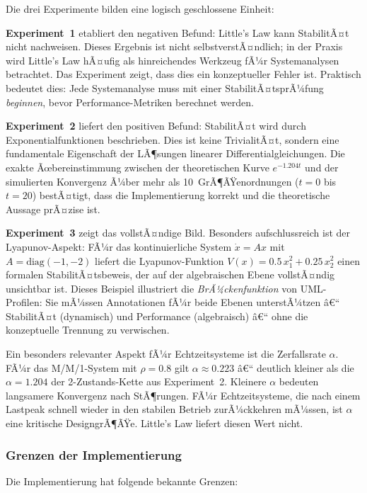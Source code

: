 ﻿\documentclass[a4paper,12pt]{scrreprt}
\theoremstyle{definition}
\begin{document}
Die drei Experimente bilden eine logisch geschlossene Einheit:

\textbf{Experiment~1} etabliert den negativen Befund: Little's Law
kann StabilitÃ¤t nicht nachweisen.  Dieses Ergebnis ist nicht
selbstverstÃ¤ndlich; in der Praxis wird Little's Law hÃ¤ufig als
hinreichendes Werkzeug fÃ¼r Systemanalysen betrachtet.  Das Experiment
zeigt, dass dies ein konzeptueller Fehler ist.  Praktisch bedeutet
dies: Jede Systemanalyse muss mit einer StabilitÃ¤tsprÃ¼fung
\emph{beginnen}, bevor Performance-Metriken berechnet werden.

\textbf{Experiment~2} liefert den positiven Befund: StabilitÃ¤t wird
durch Exponentialfunktionen beschrieben.  Dies ist keine TrivialitÃ¤t,
sondern eine fundamentale Eigenschaft der LÃ¶sungen linearer
Differentialgleichungen.  Die exakte Ãœbereinstimmung zwischen der
theoretischen Kurve $e^{-1.204t}$ und der simulierten Konvergenz
Ã¼ber mehr als 10~GrÃ¶ÃŸenordnungen ($t = 0$ bis $t = 20$) bestÃ¤tigt,
dass die Implementierung korrekt und die theoretische Aussage prÃ¤zise
ist.

\textbf{Experiment~3} zeigt das vollstÃ¤ndige Bild.  Besonders
aufschlussreich ist der Lyapunov-Aspekt: FÃ¼r das kontinuierliche
System $\dot{x} = Ax$ mit $A = \text{diag}(-1,-2)$ liefert die
Lyapunov-Funktion $V(x) = 0.5\,x_1^2 + 0.25\,x_2^2$ einen
formalen StabilitÃ¤tsbeweis, der auf der algebraischen Ebene
vollstÃ¤ndig unsichtbar ist.  Dieses Beispiel illustriert die
\emph{BrÃ¼ckenfunktion} von UML-Profilen: Sie mÃ¼ssen Annotationen
fÃ¼r beide Ebenen unterstÃ¼tzen â€“ StabilitÃ¤t (dynamisch) und
Performance (algebraisch) â€“ ohne die konzeptuelle Trennung zu
verwischen.

Ein besonders relevanter Aspekt fÃ¼r Echtzeitsysteme ist die
Zerfallsrate $\alpha$.  FÃ¼r das M/M/1-System mit $\rho = 0.8$ gilt
$\alpha \approx 0.223$ â€“ deutlich kleiner als die $\alpha = 1.204$
der 2-Zustands-Kette aus Experiment~2.  Kleinere $\alpha$ bedeuten
langsamere Konvergenz nach StÃ¶rungen.  FÃ¼r Echtzeitsysteme, die
nach einem Lastpeak schnell wieder in den stabilen Betrieb zurÃ¼ckkehren
mÃ¼ssen, ist $\alpha$ eine kritische DesigngrÃ¶ÃŸe.  Little's Law
liefert diesen Wert nicht.

\subsubsection{Grenzen der Implementierung}
\label{subsubsec:grenzen}

Die Implementierung hat folgende bekannte Grenzen:
\end{document}
